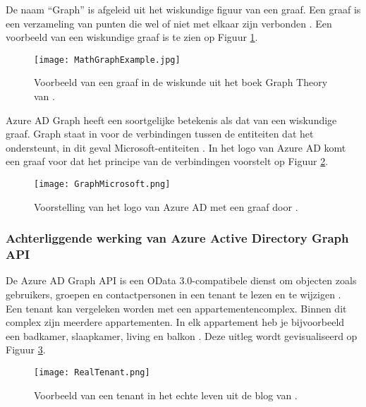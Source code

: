 De naam “Graph” is afgeleid uit het wiskundige figuur van een graaf. Een graaf is een verzameling van punten die wel of niet met elkaar zijn verbonden \autocite{Denaux2022}. Een voorbeeld van een wiskundige graaf is te zien op Figuur \ref{mga}. \\

\begin{figure}[h!]
    \texttt{[image: MathGraphExample.jpg]}
    \caption[Voorbeeld wiskundige graaf]{Voorbeeld van een graaf in de wiskunde uit het boek Graph Theory van \textcite{Diestel2010}.}
    \label{mga}
\end{figure}

Azure \ac{AD} Graph heeft een soortgelijke betekenis als dat van een wiskundige graaf. Graph staat in voor de verbindingen tussen de entiteiten dat het ondersteunt, in dit geval Microsoft-entiteiten \autocite{Kokkarinen2022}. In het logo van Azure \ac{AD} komt een graaf voor dat het principe van de verbindingen voorstelt op Figuur \ref{gms}. \\

\begin{figure}[h!]
    \texttt{[image: GraphMicrosoft.png]}
    \caption[Logo Azure Active Directory]{Voorstelling van het logo van Azure \Ac{AD} met een graaf door \textcite{Microsoftb}.}
    \label{gms}
\end{figure}

\subsubsection{Achterliggende werking van Azure Active Directory Graph API}


De Azure \ac{AD} Graph \ac{API} is een OData 3.0-compatibele dienst om objecten zoals gebruikers, groepen en contactpersonen in een tenant te lezen en te wijzigen \autocite{Microsoft2016}. \\

Een tenant kan vergeleken worden met een appartementencomplex. Binnen dit complex zijn meerdere appartementen. In elk appartement heb je bijvoorbeeld een badkamer, slaapkamer, living en balkon \autocite{Saxton2015}. Deze uitleg wordt gevisualiseerd op Figuur \ref{rlt}. \\

\begin{figure}[!h]
    \texttt{[image: RealTenant.png]}
    \caption[Voorbeeld werkelijke tenant]{Voorbeeld van een tenant in het echte leven uit de blog van \textcite{Saxton2015}.}
    \label{rlt}
\end{figure}

